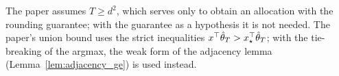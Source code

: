 \begin{remark}
  The paper assumes $T \ge d^2$, which serves only to obtain an allocation with the rounding
  guarantee; with the guarantee as a hypothesis it is not needed. The paper's union bound uses the
  strict inequalities $x^\top \hat{\theta}_T > x_\star^\top \hat{\theta}_T$; with the tie-breaking of the
  argmax, the weak form of the adjacency lemma (Lemma~\ref{lem:adjacency_ge}) is used instead.
\end{remark}
